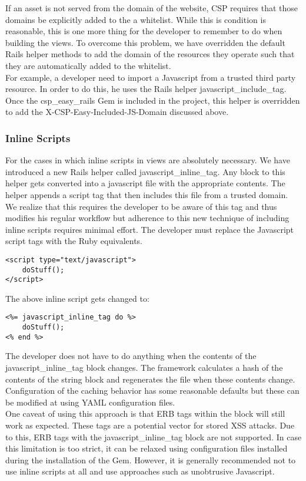 \documentclass[10pt, conference, compsocconf]{IEEEtran}
\begin{document}
If an asset is not served from the domain of the website, CSP requires that those domains be explicitly added to the a whitelist. While this is condition is reasonable, this is one more thing for the developer to remember to do when building the views. To overcome this problem, we have overridden the default Rails helper methods to add the domain of the resources they operate such that they are automatically added to the whitelist.
\\
For example, a developer need to import a Javascript from a trusted third party resource. In order to do this, he uses the Rails helper javascript\_include\_tag. Once the csp\_easy\_rails Gem is included in the project, this helper is overridden to add the X-CSP-Easy-Included-JS-Domain discussed above.


\subsubsection{Inline Scripts} %
\label{ssub:inline_scripts}

For the cases in which inline scripts in views are absolutely necessary. We have introduced a new Rails helper called javascript\_inline\_tag. Any block to this helper gets converted into a javascript file with the appropriate contents. The helper appends a script tag that then includes this file from a trusted domain. We realize that this requires the developer to be aware of this tag and thus modifies his regular workflow but adherence to this new technique of including inline scripts requires minimal effort. The developer must replace the Javascript script tags with the Ruby equivalents.

\begin{lstlisting}
<script type="text/javascript">
	doStuff();
</script>
\end{lstlisting}

The above inline script gets changed to:

\begin{lstlisting}
<%= javascript_inline_tag do %>
	doStuff();
<% end %>
\end{lstlisting}

The developer does not have to do anything when the contents of the javascript\_inline\_tag block changes. The framework calculates a hash of the contents of the string block and regenerates the file when these contents change.
\\
Configuration of the caching behavior has some reasonable defaults but these can be modified at using YAML configuration files.
\\
One caveat of using this approach is that ERB tags within the block will still work as expected. These tags are a potential vector for stored XSS attacks. Due to this, ERB tags with the javascript\_inline\_tag block are not supported. In case this limitation is too strict, it can be relaxed using configuration files installed during the installation of the Gem. However, it is generally recommended not to use inline scripts at all and use approaches such as unobtrusive Javascript.
\end{document}
